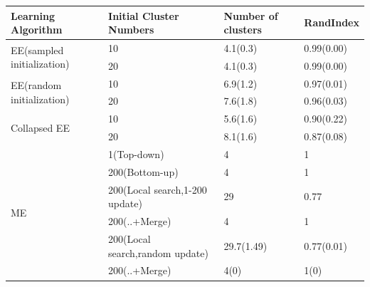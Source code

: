 \documentclass{article}
\begin{document}
\begin{spacing}{1.1}
\begin{table}[t]
\begin{center}
\begin{tabular}{|l|l|l|l|}
\hline
{\bf Learning Algorithm} &{\bf Initial Cluster Numbers} &{\bf Number of clusters}  &{\bf RandIndex} \\ 
\hline 
\multirow{2}{*}{EE(sampled initialization)} & 10 & 4.1(0.3) & 0.99(0.00) \\
					    & 20 & 4.1(0.3) & 0.99(0.00)\\
\hline
\multirow{2}{*}{EE(random initialization)}  & 10 & 6.9(1.2)&  0.97(0.01) \\
					    & 20 & 7.6(1.8)&  0.96(0.03) \\
\hline
\multirow{2}{*}{Collapsed EE}               & 10 & 5.6(1.6)&  0.90(0.22) \\
					    & 20 & 8.1(1.6)&  0.87(0.08) \\
\hline
\multirow{6}{*}{ME}                         & 1(Top-down) &    4  &  1 \\
					    & 200(Bottom-up) & 4  &  1 \\
					    & 200(Local search,1-200 update) & 29 &  0.77  \\
					    & 200(..+Merge) & 4   &  1 \\
					    & 200(Local search,random update) & 29.7(1.49)&  0.77(0.01) \\
					    & 200(..+Merge) & 4(0)&  1(0) \\
\hline
\end{tabular}
\end{center}
\end{table}


\end{spacing}
\end{document}
